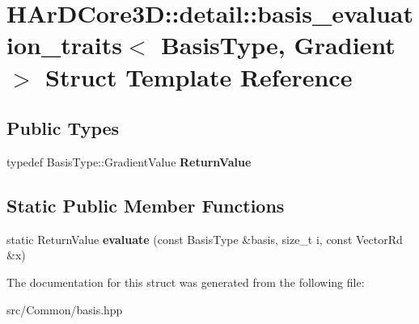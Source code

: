 \hypertarget{structHArDCore3D_1_1detail_1_1basis__evaluation__traits_3_01BasisType_00_01Gradient_01_4}{}\section{H\+Ar\+D\+Core3D\+:\+:detail\+:\+:basis\+\_\+evaluation\+\_\+traits$<$ Basis\+Type, Gradient $>$ Struct Template Reference}
\label{structHArDCore3D_1_1detail_1_1basis__evaluation__traits_3_01BasisType_00_01Gradient_01_4}
\subsection*{Public Types}
\begin{DoxyCompactItemize}
\item 
\mbox{\label{structHArDCore3D_1_1detail_1_1basis__evaluation__traits_3_01BasisType_00_01Gradient_01_4_aebcec3c8eba77d1982728a44c6eb4f2e}} 
typedef Basis\+Type\+::\+Gradient\+Value {\bfseries Return\+Value}
\end{DoxyCompactItemize}
\subsection*{Static Public Member Functions}
\begin{DoxyCompactItemize}
\item 
\mbox{\label{structHArDCore3D_1_1detail_1_1basis__evaluation__traits_3_01BasisType_00_01Gradient_01_4_a1b36aa15e1d24a03d14e53c7f6c1fe1e}} 
static Return\+Value {\bfseries evaluate} (const Basis\+Type \&basis, size\+\_\+t i, const Vector\+Rd \&x)
\end{DoxyCompactItemize}


The documentation for this struct was generated from the following file\+:\begin{DoxyCompactItemize}
\item 
src/\+Common/basis.\+hpp\end{DoxyCompactItemize}
